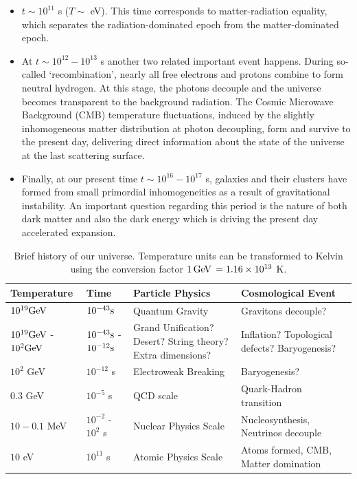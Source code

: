 \begin{itemize}
\item $t\sim10^{11}$ s ($T\sim$ eV). This time corresponds to matter-radiation equality, which separates the radiation-dominated epoch from the matter-dominated epoch.

\item  At $t\sim 10^{12}-10^{13}$ s another two related important event happens. During so-called `recombination', nearly all free electrons and protons combine to form neutral hydrogen.  At this stage, the photons decouple and the universe becomes transparent to the background radiation. The Cosmic Microwave Background (CMB) temperature fluctuations, induced by the slightly inhomogeneous matter distribution at photon decoupling, form and survive to the present day, delivering direct information about the state of the universe at the last scattering surface.

\item Finally, at our present time $t\sim 10^{16}-10^{17}$ s,  galaxies and their clusters have formed from  small primordial inhomogeneities as a result of gravitational instability. An important question regarding this period is the nature of both dark matter and also the dark energy which is driving the present day accelerated expansion.
\end{itemize}

\begin{table}
[H]
\begin{center}
\centering
\begin{tabular}{| l |  m{8em}  | m{10em}| m{10em} | m{10em} | }
\hline
\cellcolor[gray]{0.9}  {\bf Temperature} &  \cellcolor[gray]{0.9} {\bf Time }&  \cellcolor[gray]{0.9} {\bf Particle Physics } &  \cellcolor[gray]{0.9} {\bf Cosmological Event}   \\
\hline \hline
$10^{19} {\rm GeV}$   & $10^{-43} {\rm s}$ & Quantum Gravity & Gravitons decouple?   \\
\hline
$10^{19} {\rm GeV}$ -  $10^2 {\rm GeV}$   &  $10^{-43} {\rm s}$ - $10^{-12} {\rm s}$ & Grand Unification?  Desert? String theory? Extra dimensions?  &  Inflation? Topological defects? Baryogenesis?\\
\hline
 $10^2$ GeV & $10^{-12}$ s   & Electroweak Breaking & Baryogenesis?    \\
\hline
 $0.3$ GeV & $10^{-5}$ s   & QCD scale & Quark-Hadron transition    \\
\hline
 $10-0.1$ MeV & $10^{-2}$ - $10^2$ s   & Nuclear Physics Scale & Nucleosynthesis, Neutrinos decouple     \\
\hline
$10$ eV & $10^{11}$ s   & Atomic Physics Scale & Atoms formed, CMB, Matter domination     \\
\hline
\end{tabular}
\end{center}
\caption {Brief history of our universe. Temperature units can be transformed to Kelvin using the conversion factor $1\,{\rm GeV}\, =1.16 \times 10^{13}$ K.}
\label{tab:universe_evol}
\end{table}

